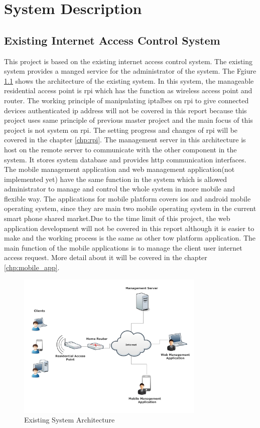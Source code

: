 \chapter{System Description}
\label{chp:system_description}

\section{Existing Internet Access Control System}
\par This project is based on the existing internet access control system. The existing system provides a manged service for the administrator of the system. The Fgiure \ref{fig:presystem} shows the architecture of the existing system. In this system, the manageable residential access point is \gls{rpi} which has the function as wireless access point and router. The working principle of manipulating iptalbes on \gls{rpi} to give connected devices authenticated \gls{ip} address will not be covered in this report because this project uses same principle of previous master project \cite{TorgeirMR} and the main focus of this project is not system on \gls{rpi}. The setting progress and changes of \gls{rpi} will be covered in the chapter \ref{chp:rpi}. The management server in this architecture is host on the remote server to communicate with the other component in the system. It stores system database and provides \gls{http} communication interfaces. The mobile management application and web management application(not implemented yet) have the same function in the system which is allowed administrator to manage and control the whole system in more mobile and flexible way. The applications for mobile platform covers \gls{ios} and android mobile operating system, since they are main two mobile operating system in the current smart phone shared market.Due to the time limit of this project, the web application development will not be covered in this report although it is easier to make and the working process is the same as other tow platform application. The main function of the mobile applications is to manage the client user internet access request. More detail about it will be covered in the chapter \ref{chp:mobile_app}.
\begin{figure}
	\centering
    	\includegraphics[width=0.80\textwidth,natwidth=610,natheight=642]{figs/presystem.png}
  	\caption{Existing System Architecture}
  	\label{fig:presystem}
\end{figure}

